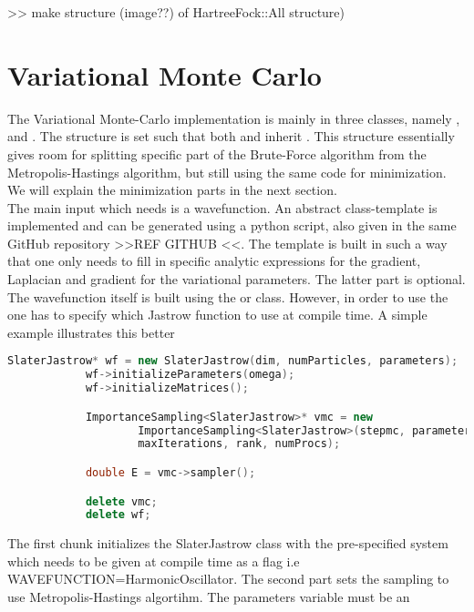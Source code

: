     >> make structure (image??) of HartreeFock::All structure)

\section{Variational Monte Carlo}
    The Variational Monte-Carlo implementation is mainly in three classes,
    namely ,  and
    . The structure is set such that both
     and  inherit
    . This structure essentially gives room for splitting
    specific part of the Brute-Force algorithm from the Metropolis-Hastings
    algorithm, but still using the same code for minimization. We will explain
    the minimization parts in the next section. \\ 
    The main input which  needs is a wavefunction. An abstract
    class-template is implemented and can be generated using a python script,
    also given in the same GitHub repository >>REF GITHUB <<. The template is
    built in such a way that one only needs to fill in specific analytic
    expressions for the gradient, Laplacian and gradient for the variational
    parameters. The latter part is optional. \\ 
    The wavefunction itself is built using the  or
     class. However, in order to use the
     one has to specify which Jastrow function to use
    at compile time. A simple example illustrates this better
        \begin{lstlisting}[language=C++, style=ccstyle]
            SlaterJastrow* wf = new SlaterJastrow(dim, numParticles, parameters);
            wf->initializeParameters(omega);
            wf->initializeMatrices();

            ImportanceSampling<SlaterJastrow>* vmc = new
                    ImportanceSampling<SlaterJastrow>(stepmc, parameters,
                    maxIterations, rank, numProcs);

            double E = vmc->sampler();

            delete vmc;
            delete wf;
        \end{lstlisting}
    The first chunk initializes the SlaterJastrow class with the pre-specified
    system which needs to be given at compile time as a flag i.e
    WAVEFUNCTION=HarmonicOscillator. The second part sets the sampling to use
    Metropolis-Hastings algortihm. The parameters variable must be an
